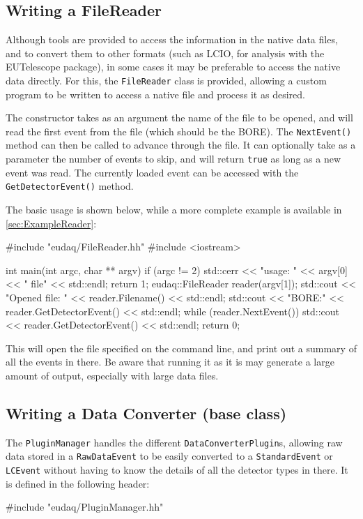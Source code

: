 \subsection{Writing a FileReader}\label{sec:FileReaderWriting}
Although tools are provided to access the information in the native data files,
and to convert them to other formats (such as LCIO, for analysis with the EUTelescope package),
in some cases it may be preferable to access the native data directly.
For this, the \texttt{FileReader} class is provided,
allowing a custom program to be written to access a native file and process it as desired.

The constructor takes as an argument the name of the file to be opened,
and will read the first event from the file (which should be the \gls{BORE}).
The \texttt{NextEvent()} method can then be called to advance through the file.
It can optionally take as a parameter the number of events to skip,
and will return \texttt{true} as long as a new event was read.
The currently loaded event can be accessed with the \texttt{GetDetectorEvent()} method.

The basic usage is shown below, while a more complete example is available in \autoref{sec:ExampleReader}:
\begin{listing}
#include "eudaq/FileReader.hh"
#include <iostream>

int main(int argc, char ** argv) {
  if (argc != 2) {
    std::cerr << "usage: " << argv[0] << " file" << std::endl;
    return 1;
  }
  eudaq::FileReader reader(argv[1]);
  std::cout << "Opened file: " << reader.Filename() << std::endl;
  std::cout << "BORE:\n" << reader.GetDetectorEvent() << std::endl;
  while (reader.NextEvent()) {
    std::cout << reader.GetDetectorEvent() << std::endl;
  }
  return 0;
}
\end{listing}

This will open the file specified on the command line,
and print out a summary of all the events in there.
Be aware that running it as it is may generate a large amount of output,
especially with large data files.

\subsection{Writing a Data Converter (base class)}\label{sec:BaseConverterWriting}
The \texttt{PluginManager} handles the different \texttt{DataConverterPlugin}s,
allowing raw data stored in a \texttt{RawDataEvent} to be easily converted
to a \texttt{StandardEvent} or \texttt{LCEvent} without having to know the details of all the detector types in there.
It is defined in the following header:
\begin{listing}
#include "eudaq/PluginManager.hh"
\end{listing}

